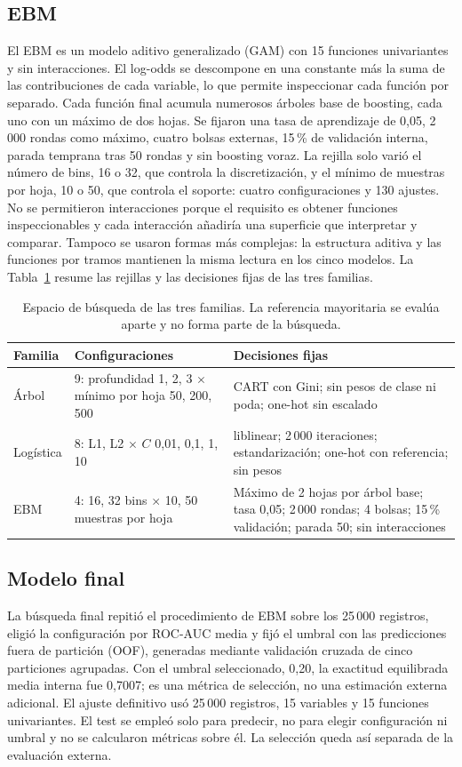 \subsection{EBM}

El EBM es un modelo aditivo generalizado (GAM) con 15 funciones univariantes y sin interacciones. El log-odds se descompone en una constante más la suma de las contribuciones de cada variable, lo que permite inspeccionar cada función por separado. Cada función final acumula numerosos árboles base de boosting, cada uno con un máximo de dos hojas. Se fijaron una tasa de aprendizaje de 0,05, 2\,000 rondas como máximo, cuatro bolsas externas, 15\,\% de validación interna, parada temprana tras 50 rondas y sin boosting voraz. La rejilla solo varió el número de bins, 16 o 32, que controla la discretización, y el mínimo de muestras por hoja, 10 o 50, que controla el soporte: cuatro configuraciones y 130 ajustes. No se permitieron interacciones porque el requisito es obtener funciones inspeccionables y cada interacción añadiría una superficie que interpretar y comparar. Tampoco se usaron formas más complejas: la estructura aditiva y las funciones por tramos mantienen la misma lectura en los cinco modelos. La Tabla~\ref{tab:search} resume las rejillas y las decisiones fijas de las tres familias.

\begin{table}[H]
\centering
\small
\caption{Espacio de búsqueda de las tres familias. La referencia mayoritaria se evalúa aparte y no forma parte de la búsqueda.}
\label{tab:search}
\begin{tabularx}{\textwidth}{@{}p{1.8cm} p{5.6cm} X@{}}
\toprule
Familia & Configuraciones & Decisiones fijas \\
\midrule
Árbol & 9: profundidad 1, 2, 3 $\times$ mínimo por hoja 50, 200, 500 & CART con Gini; sin pesos de clase ni poda; one-hot sin escalado \\
Logística & 8: L1, L2 $\times$ $C$ 0,01, 0,1, 1, 10 & liblinear; 2\,000 iteraciones; estandarización; one-hot con referencia; sin pesos \\
EBM & 4: 16, 32 bins $\times$ 10, 50 muestras por hoja & Máximo de 2 hojas por árbol base; tasa 0,05; 2\,000 rondas; 4 bolsas; 15\,\% validación; parada 50; sin interacciones \\
\bottomrule
\end{tabularx}
\end{table}

\subsection{Modelo final}
La búsqueda final repitió el procedimiento de EBM sobre los 25\,000 registros, eligió la configuración por ROC-AUC media y fijó el umbral con las predicciones fuera de partición (OOF), generadas mediante validación cruzada de cinco particiones agrupadas. Con el umbral seleccionado, 0,20, la exactitud equilibrada media interna fue 0,7007; es una métrica de selección, no una estimación externa adicional. El ajuste definitivo usó 25\,000 registros, 15 variables y 15 funciones univariantes. El test se empleó solo para predecir, no para elegir configuración ni umbral y no se calcularon métricas sobre él. La selección queda así separada de la evaluación externa.
